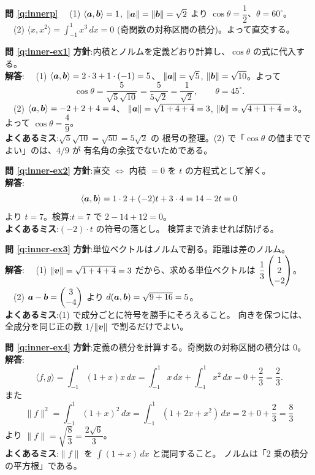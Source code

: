 \noindent\textbf{問 \ref{q:innerp}}\quad
　(1) $\langle \bm{a}, \bm{b} \rangle = 1$,
$\|\bm{a}\| = \|\bm{b}\| = \sqrt{2}$ より
$\cos\theta = \dfrac{1}{2}$、$\theta = 60^\circ$。\\
　(2) $\displaystyle \langle x, x^2 \rangle = \int_{-1}^{1} x^3\,dx = 0$
(奇関数の対称区間の積分)。よって直交する。

\bigskip
\noindent\textbf{問 \ref{q:inner-ex1}}\quad
\textbf{方針}:内積とノルムを定義どおり計算し、$\cos\theta$ の式に代入する。\\
\textbf{解答}:
　(1) $\langle \bm{a}, \bm{b} \rangle = 2 \cdot 3 + 1 \cdot (-1) = 5$、
$\|\bm{a}\| = \sqrt{5}$, $\|\bm{b}\| = \sqrt{10}$。よって
\[
\cos\theta = \frac{5}{\sqrt{5}\sqrt{10}} = \frac{5}{5\sqrt{2}}
= \frac{1}{\sqrt{2}}, \qquad \theta = 45^\circ.
\]
　(2) $\langle \bm{a}, \bm{b} \rangle = -2 + 2 + 4 = 4$、
$\|\bm{a}\| = \sqrt{1 + 4 + 4} = 3$, $\|\bm{b}\| = \sqrt{4 + 1 + 4} = 3$。
よって $\cos\theta = \dfrac{4}{9}$。\\
\textbf{よくあるミス}:$\sqrt{5}\sqrt{10} = \sqrt{50} = 5\sqrt{2}$ の
根号の整理。(2) で「$\cos\theta$ の値まででよい」のは、$4/9$ が
有名角の余弦でないためである。

\bigskip
\noindent\textbf{問 \ref{q:inner-ex2}}\quad
\textbf{方針}:直交 $\iff$ 内積 $= 0$ を $t$ の方程式として解く。\\
\textbf{解答}:
\[
\langle \bm{a}, \bm{b} \rangle = 1 \cdot 2 + (-2)t + 3 \cdot 4
= 14 - 2t = 0
\]
より $t = 7$。検算:$t = 7$ で $2 - 14 + 12 = 0$。\\
\textbf{よくあるミス}:$(-2) \cdot t$ の符号の落とし。
検算まで済ませれば防げる。

\bigskip
\noindent\textbf{問 \ref{q:inner-ex3}}\quad
\textbf{方針}:単位ベクトルはノルムで割る。距離は差のノルム。\\
\textbf{解答}:
　(1) $\|\bm{v}\| = \sqrt{1 + 4 + 4} = 3$ だから、求める単位ベクトルは
$\dfrac{1}{3}\begin{pmatrix}1 \\ 2 \\ -2\end{pmatrix}$。\\
　(2) $\bm{a} - \bm{b} = \begin{pmatrix}3 \\ -4\end{pmatrix}$ より
$d(\bm{a}, \bm{b}) = \sqrt{9 + 16} = 5$。\\
\textbf{よくあるミス}:(1) で成分ごとに符号を勝手にそろえること。
向きを保つには、全成分を同じ正の数 $1/\|\bm{v}\|$ で割るだけでよい。

\bigskip
\noindent\textbf{問 \ref{q:inner-ex4}}\quad
\textbf{方針}:定義の積分を計算する。奇関数の対称区間の積分は $0$。\\
\textbf{解答}:
\[
\langle f, g \rangle = \int_{-1}^{1} (1 + x)x\,dx
= \int_{-1}^{1} x\,dx + \int_{-1}^{1} x^2\,dx = 0 + \frac{2}{3} = \frac{2}{3}.
\]
また
\[
\|f\|^2 = \int_{-1}^{1} (1 + x)^2\,dx
= \int_{-1}^{1} (1 + 2x + x^2)\,dx = 2 + 0 + \frac{2}{3} = \frac{8}{3}
\]
より $\|f\| = \sqrt{\dfrac{8}{3}} = \dfrac{2\sqrt{6}}{3}$。\\
\textbf{よくあるミス}:$\|f\|$ を $\int (1+x)\,dx$ と混同すること。
ノルムは「$2$ 乗の積分の平方根」である。

